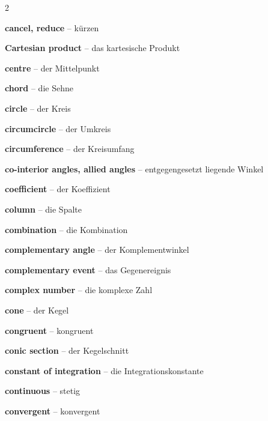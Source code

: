 \begin{multicols}{2}
\par\nopagebreak
\textbf{cancel, reduce} -- kürzen\dotfill\hyperref[e:37]{\pageref*{e:37}}\par
\textbf{Cartesian product} -- das kartesische Produkt\dotfill\hyperref[e:103]{\pageref*{e:103}}\par
\textbf{centre} -- der Mittelpunkt\dotfill\hyperref[e:212]{\pageref*{e:212}}\par
\textbf{chord} -- die Sehne\dotfill\hyperref[e:218]{\pageref*{e:218}}\par
\textbf{circle} -- der Kreis\dotfill\hyperref[e:211]{\pageref*{e:211}}\par
\textbf{circumcircle} -- der Umkreis\dotfill\hyperref[e:194]{\pageref*{e:194}}\par
\textbf{circumference} -- der Kreisumfang\dotfill\hyperref[e:215]{\pageref*{e:215}}\par
\textbf{co-interior angles, allied angles} -- entgegengesetzt liegende Winkel\dotfill\hyperref[e:169]{\pageref*{e:169}}\par
\textbf{coefficient} -- der Koeffizient\dotfill\hyperref[e:74]{\pageref*{e:74}}\par
\textbf{column} -- die Spalte\dotfill\hyperref[e:323]{\pageref*{e:323}}\par
\textbf{combination} -- die Kombination\dotfill\hyperref[e:343]{\pageref*{e:343}}\par
\textbf{complementary angle} -- der Komplementwinkel\dotfill\hyperref[e:164]{\pageref*{e:164}}\par
\textbf{complementary event} -- das Gegenereignis\dotfill\hyperref[e:329]{\pageref*{e:329}}\par
\textbf{complex number} -- die komplexe Zahl\dotfill\hyperref[e:10]{\pageref*{e:10}}\par
\textbf{cone} -- der Kegel\dotfill\hyperref[e:231]{\pageref*{e:231}}\par
\textbf{congruent} -- kongruent\dotfill\hyperref[e:175]{\pageref*{e:175}}\par
\textbf{conic section} -- der Kegelschnitt\dotfill\hyperref[e:312]{\pageref*{e:312}}\par
\textbf{constant of integration} -- die Integrationskonstante\dotfill\hyperref[e:292]{\pageref*{e:292}}\par
\textbf{continuous} -- stetig\dotfill\hyperref[e:268]{\pageref*{e:268}}\par
\textbf{convergent} -- konvergent\dotfill\hyperref[e:262]{\pageref*{e:262}}\par

\end{multicols}
